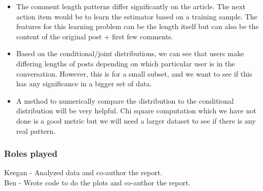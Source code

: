 \documentclass[a4paper,12pt]{article}
\numberwithin{equation}{section}
\begin{document}
\begin{itemize}
\item The comment length patterns differ significantly on the article. The next action item would be to learn the estimator based on a training sample. The features for this learning problem can be the length itself but can also be the content of the original post + first few comments.
\item Based on the conditional/joint distributions, we can see that users make differing lengths of posts depending on which particular user is in the conversation. However, this is for a small subset, and we want to see if this has any significance in a bigger set of data. 
\item A method to numerically compare the distribution to the conditional distribution will be very helpful. Chi square computation which we have not done is a good metric but we will need a larger dataset to see if there is any real pattern. 
\end{itemize}



\subsubsection*{Roles played}

Keegan - Analyzed data and co-author the report.  \\
Ben - Wrote code to do the plots and co-author the report.

\clearpage

	
\end{document}
